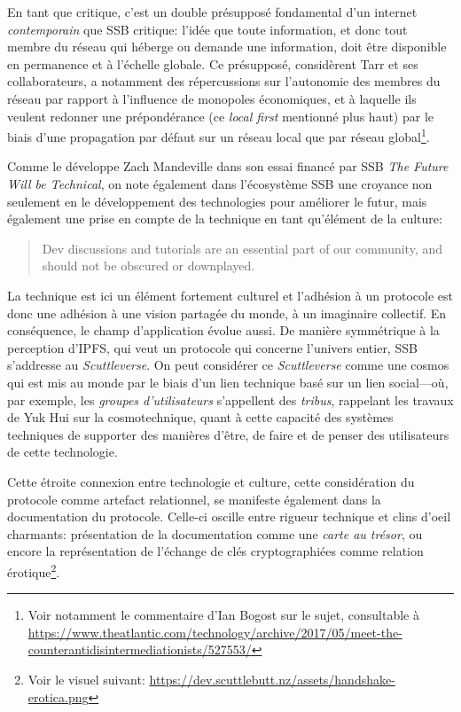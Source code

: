 \documentclass{article}
\begin{document}
En tant que critique, c'est un double présupposé fondamental d'un internet \emph{contemporain} que SSB critique: l'idée que toute information, et donc tout membre du réseau qui héberge ou demande une information, doit être disponible en permanence et à l'échelle globale. Ce présupposé, considèrent Tarr et ses collaborateurs, a notamment des répercussions sur l'autonomie des membres du réseau par rapport à l'influence de monopoles économiques, et à laquelle ils veulent redonner une prépondérance (ce \emph{local first} mentionné plus haut) par le biais d'une propagation par défaut sur un réseau local que par réseau global\footnote{Voir notamment le commentaire d'Ian Bogost sur le sujet, consultable à \url{https://www.theatlantic.com/technology/archive/2017/05/meet-the-counterantidisintermediationists/527553/}}.

Comme le développe Zach Mandeville dans son essai financé par SSB \emph{The Future Will be Technical}, on note également dans l'écosystème SSB une croyance non seulement en le développement des technologies pour améliorer le futur, mais également une prise en compte de la technique en tant qu'élément de la culture:

\begin{quote}
    Dev discussions and tutorials are an essential part of our community, and should not be obscured or downplayed\cite{mandeville_future_nodate}.
\end{quote}

La technique est ici un élément fortement culturel et l'adhésion à un protocole est donc une adhésion à une vision partagée du monde, à un imaginaire collectif\cite{hall_representation_1997}. En conséquence, le champ d'application évolue aussi. De manière symmétrique à la perception d'IPFS, qui veut un protocole qui concerne l'univers entier, SSB s'addresse au \emph{Scuttleverse}. On peut considérer ce \emph{Scuttleverse} comme une cosmos qui est mis au monde par le biais d'un lien technique basé sur un lien social—où, par exemple, les \emph{groupes d'utilisateurs} s'appellent des \emph{tribus}, rappelant les travaux de Yuk Hui sur la cosmotechnique, quant à cette capacité des systèmes techniques de supporter des manières d'être, de faire et de penser des utilisateurs de cette technologie.

Cette étroite connexion entre technologie et culture, cette considération du protocole comme artefact relationnel, se manifeste également dans la documentation du protocole. Celle-ci oscille entre rigueur technique et clins d'oeil charmants: présentation de la documentation comme une \emph{carte au trésor}, ou encore la représentation de l'échange de clés cryptographiées comme relation érotique\footnote{Voir le visuel suivant: \url{https://dev.scuttlebutt.nz/assets/handshake-erotica.png}}.
\end{document}
